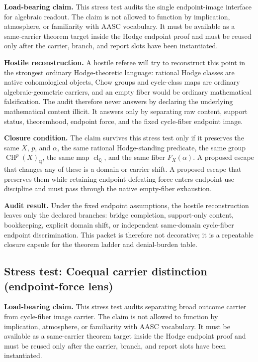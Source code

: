 \documentclass[11pt]{article}
\newcommand{\QQ}{\mathbb{Q}}
\newcommand{\CH}{\operatorname{CH}}
\newcommand{\clQ}{\operatorname{cl}_{\QQ}}
\begin{document}
\par\noindent\textbf{Load-bearing claim.} This stress test audits the single endpoint-image interface for algebraic readout. The claim is not allowed to function by implication, atmosphere, or familiarity with AASC vocabulary. It must be available as a same-carrier theorem target inside the Hodge endpoint proof and must be reused only after the carrier, branch, and report slots have been instantiated.

\par\noindent\textbf{Hostile reconstruction.} A hostile referee will try to reconstruct this point in the strongest ordinary Hodge-theoretic language: rational Hodge classes are native cohomological objects, Chow groups and cycle-class maps are ordinary algebraic-geometric carriers, and an empty fiber would be ordinary mathematical falsification. The audit therefore never answers by declaring the underlying mathematical content illicit. It answers only by separating raw content, support status, theoremhood, endpoint force, and the fixed cycle-fiber endpoint image.

\par\noindent\textbf{Closure condition.} The claim survives this stress test only if it preserves the same $X$, $p$, and $\alpha$, the same rational Hodge-standing predicate, the same group $\CH^p(X)_\QQ$, the same map $\clQ$, and the same fiber $F_X(\alpha)$. A proposed escape that changes any of these is a domain or carrier shift. A proposed escape that preserves them while retaining endpoint-defeating force enters endpoint-use discipline and must pass through the native empty-fiber exhaustion.

\par\noindent\textbf{Audit result.} Under the fixed endpoint assumptions, the hostile reconstruction leaves only the declared branches: bridge completion, support-only content, bookkeeping, explicit domain shift, or independent same-domain cycle-fiber endpoint discrimination. This packet is therefore not decorative; it is a repeatable closure capsule for the theorem ladder and denial-burden table.


\subsection{Stress test: Coequal carrier distinction (endpoint-force lens)}

\par\noindent\textbf{Load-bearing claim.} This stress test audits separating broad outcome carrier from cycle-fiber image carrier. The claim is not allowed to function by implication, atmosphere, or familiarity with AASC vocabulary. It must be available as a same-carrier theorem target inside the Hodge endpoint proof and must be reused only after the carrier, branch, and report slots have been instantiated.
\end{document}
